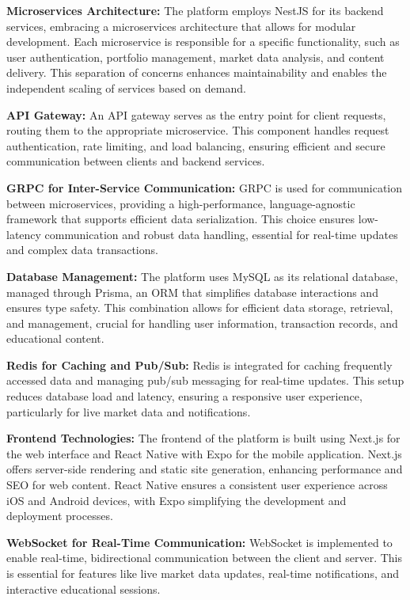 \documentclass[12pt]{report}
\begin{document}
\textbf{Microservices Architecture:} The platform employs NestJS for its backend services, embracing a microservices architecture that allows for modular development. Each microservice is responsible for a specific functionality, such as user authentication, portfolio management, market data analysis, and content delivery. This separation of concerns enhances maintainability and enables the independent scaling of services based on demand.

\textbf{API Gateway:} An API gateway serves as the entry point for client requests, routing them to the appropriate microservice. This component handles request authentication, rate limiting, and load balancing, ensuring efficient and secure communication between clients and backend services.

\textbf{GRPC for Inter-Service Communication:} GRPC is used for communication between microservices, providing a high-performance, language-agnostic framework that supports efficient data serialization. This choice ensures low-latency communication and robust data handling, essential for real-time updates and complex data transactions.

\textbf{Database Management:} The platform uses MySQL as its relational database, managed through Prisma, an ORM that simplifies database interactions and ensures type safety. This combination allows for efficient data storage, retrieval, and management, crucial for handling user information, transaction records, and educational content.

\textbf{Redis for Caching and Pub/Sub:} Redis is integrated for caching frequently accessed data and managing pub/sub messaging for real-time updates. This setup reduces database load and latency, ensuring a responsive user experience, particularly for live market data and notifications.

\textbf{Frontend Technologies:} The frontend of the platform is built using Next.js for the web interface and React Native with Expo for the mobile application. Next.js offers server-side rendering and static site generation, enhancing performance and SEO for web content. React Native ensures a consistent user experience across iOS and Android devices, with Expo simplifying the development and deployment processes.

\textbf{WebSocket for Real-Time Communication:} WebSocket is implemented to enable real-time, bidirectional communication between the client and server. This is essential for features like live market data updates, real-time notifications, and interactive educational sessions.
\end{document}
